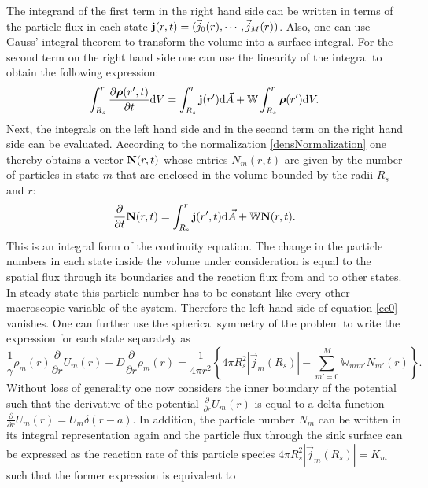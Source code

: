 The integrand of the first term in the right hand side can be written in terms of the particle flux in each state $\boldsymbol{\mathbf{j}}(r,t) = (\vec{j}_{0}(r), \cdots , \vec{j}_{M}(r))$. Also, one can use Gauss' integral theorem to transform the volume into a surface integral. For the second term on the right hand side one can use the linearity of the integral to obtain the following expression:
\begin{equation}
    \int_{R_s}^{r} \frac{\partial \boldsymbol{\mathbf{\rho}}(r',t)}{\partial t} {\rm d} V = \int_{R_s}^{r} \boldsymbol{\mathbf{j}}(r') {\rm d} \vec{A} + \mathbb{W} \int_{R_s}^{r} \boldsymbol{\mathbf{\rho}}(r') {\rm d} V.
    \label{ce0}
\end{equation}
Next, the integrals on the left hand side and in the second term on the right hand side can be evaluated. According to the normalization \eqref{densNormalization} one thereby obtains a vector $\boldsymbol{\mathbf{N}}(r,t)$ whose entries $N_m(r,t)$ are given by the number of particles in state $m$ that are enclosed in the volume bounded by the radii $R_s$ and $r$:
\begin{equation}
    \frac{\partial}{\partial t} \boldsymbol{\mathbf{N}}(r,t) = \int_{R_s}^{r} \boldsymbol{\mathbf{j}}(r',t) {\rm d} \vec{A} + \mathbb{W} \boldsymbol{\mathbf{N}}(r,t).
    \label{integral_ce}
\end{equation}
This is an integral form of the continuity equation. The change in the particle numbers in each state inside the volume under consideration is equal to the spatial flux through its boundaries and the reaction flux from and to other states. \\
In steady state this particle number has to be constant like every other macroscopic variable of the system. Therefore the left hand side of equation \eqref{ce0} vanishes. One can further use the spherical symmetry of the problem to write the expression for each state separately as
\begin{equation}
    \frac{1}{\gamma} \rho_m(r) \frac{\partial}{\partial r} U_m(r) + D\frac{\partial}{\partial r} \rho_m(r) =\frac{1}{4 \pi r^2} \left\{ 4 \pi R_s^2 |\vec{j}_m(R_s)| - \sum_{m'=0}^{M} \mathbb{W}_{mm'} N_{m'}(r) \right\}.
    \label{ce1}
\end{equation}
Without loss of generality one now considers the inner boundary of the potential such that the derivative of the potential $\frac{\partial}{\partial r}U_m(r)$ is equal to a delta function $\frac{\partial}{\partial r}U_m(r) = U_m \delta (r-a)$. In addition, the particle number $N_m$ can be written in its integral representation again and the particle flux through the sink surface can be expressed as the reaction rate of this particle species $4 \pi R_s^{2} |\vec{j}_m(R_s)| = K_m$ such that the former expression is equivalent to
